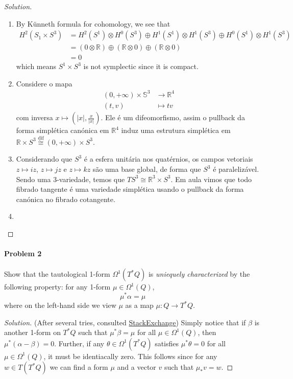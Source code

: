 \begin{proof}[Solution]\leavevmode
	\begin{enumerate}[label=\alph*.]
		\item By K\"unneth formula for cohomology, we see that
			\begin{align*}
				H^{2}(S_1\times S^3)&=H^{2}(S^1)\otimes H^{0}(S^3)\oplus H^{1}(S^1)\otimes H^{1}(S^3)\oplus H^{0}(S^1)\otimes H^{1}(S^3)\\
				&=(0\otimes  \mathbb{R})\oplus (\mathbb{R}\otimes 0)\oplus (\mathbb{R}\otimes 0)\\
				&=0
			\end{align*}
		which means $S^1\times S^3$ is not symplectic since it is compact.

		\item Considere o mapa
			\begin{align*}
				(0,+\infty)\times \mathbb{S}^3 &\longrightarrow \mathbb{R}^4 \\
				(t,v) &\longmapsto tv
			\end{align*}
			com inversa $x\mapsto \left( |x|,\frac{x}{|x|} \right)$. Ele \'e um difeomorfismo, assim o pullback da forma simpl\'etica can\'onica em $\mathbb{R}^{4}$ induz uma estrutura simpl\'etica em $\mathbb{R}\times S^3\overset{\operatorname{dif}}{\cong} (0,+\infty)\times S^3$.

		\item Considerando que $S^3$ \'e a esfera unit\'aria nos quat\'ernios, os campos vetoriais $z\mapsto iz$, $z\mapsto jz$ e $z\mapsto kz$ s\~ao uma base global, de forma que $S^3$ \'e paraleliz\'avel. Sendo uma 3-variedade, temos que $TS^3\cong \mathbb{R}^{3}\times S^3$. Em aula vimos que todo fibrado tangente \'e uma variedade simpl\'etica usando o pullback da forma can\'onica no fibrado cotangente.

		\item 
	\end{enumerate}
\end{proof}

\paragraph{Problem 2} Show that the tautological 1-form $\Omega^{1}(T^*Q)$ is \textit{uniequely characterized} by the following property: for any 1-form $\mu\in\Omega^{1}(Q)$,
\[\mu^*\alpha=\mu\]
where on the left-hand side we view  $\mu$ as a map $\mu:Q\to T^*Q$.

\begin{proof}[Solution]\leavevmode
	(After several tries, consulted \href{https://math.stackexchange.com/questions/4141107/a-characterization-of-the-tautological-form-liouville-1-form-on-the-cotangent}{StackExchange}) Simply notice that if $\beta$ is another 1-form on  $T^*Q$ such that $\mu^*\beta=\mu$ for all $\mu\in\Omega^{1}(Q)$, then  $\mu^*(\alpha-\beta)=0$. Further, if any  $\theta\in\Omega^{1}(T^*Q)$ satisfies $\mu^*\theta=0$ for all $\mu\in\Omega^{1}(Q)$, it must be identiacally zero. This follows since for any $w\in T(T^*Q)$ we can find a form $\mu$ and a vector $v$ such that $\mu_*v=w$.
\end{proof}


